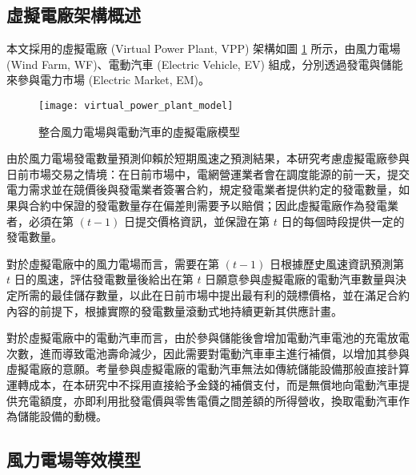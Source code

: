 \subsection{虛擬電廠架構概述}

本文採用的虛擬電廠 (Virtual Power Plant, VPP) 架構如圖 \ref{figure: Virtual Power Plant Model} 所示，由風力電場 (Wind Farm, WF)、電動汽車 (Electric Vehicle, EV) 組成，分別透過發電與儲能來參與電力市場 (Electric Market, EM)。

\begin{figure}[htbp]
  \centering
  \texttt{[image: virtual\_power\_plant\_model]}
  \caption{整合風力電場與電動汽車的虛擬電廠模型}
  \label{figure: Virtual Power Plant Model}
\end{figure}

由於風力電場發電數量預測仰賴於短期風速之預測結果，本研究考慮虛擬電廠參與日前市場交易之情境：在日前市場中，電網營運業者會在調度能源的前一天，提交電力需求並在競價後與發電業者簽署合約，規定發電業者提供約定的發電數量，如果與合約中保證的發電數量存在偏差則需要予以賠償；因此虛擬電廠作為發電業者，必須在第 $(t-1)$ 日提交價格資訊，並保證在第 $t$ 日的每個時段提供一定的發電數量。

對於虛擬電廠中的風力電場而言，需要在第 $(t-1)$ 日根據歷史風速資訊預測第 $t$ 日的風速，評估發電數量後給出在第 $t$ 日願意參與虛擬電廠的電動汽車數量與決定所需的最佳儲存數量，以此在日前市場中提出最有利的競標價格，並在滿足合約內容的前提下，根據實際的發電數量滾動式地持續更新其供應計畫。

對於虛擬電廠中的電動汽車而言，由於參與儲能後會增加電動汽車電池的充電放電次數，進而導致電池壽命減少，因此需要對電動汽車車主進行補償，以增加其參與虛擬電廠的意願。考量參與虛擬電廠的電動汽車無法如傳統儲能設備那般直接計算運轉成本，在本研究中不採用直接給予金錢的補償支付，而是無償地向電動汽車提供充電額度，亦即利用批發電價與零售電價之間差額的所得營收，換取電動汽車作為儲能設備的動機。

\subsection{風力電場等效模型}

